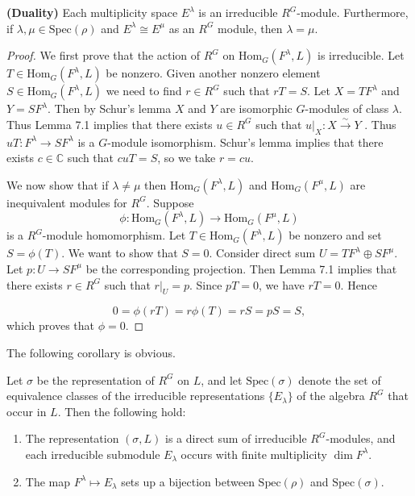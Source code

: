 \documentclass[12pt]{article}
\newenvironment{theorem}[2][Theorem]{\begin{trivlist}
\item[\hskip \labelsep {\bfseries #1}\hskip \labelsep {\bfseries #2.}]}{\end{trivlist}}
\newenvironment{corollary}[2][Corollary]{\begin{trivlist}
\item[\hskip \labelsep {\bfseries #1}\hskip \labelsep {\bfseries #2.}]}{\end{trivlist}}
\begin{document}
    \begin{theorem}{7.2} 
        \textbf{(Duality)} Each multiplicity space $E^\lambda$ is an irreducible $R^G$-module. Furthermore, if $\lambda, \mu \in \mathrm{Spec}(\rho)$ and $E^\lambda \cong E^\mu$ as an $R^G$ module, then $\lambda = \mu$.
    \end{theorem}
    \begin{proof}
        We first prove that the action of $R^G$ on $\mathrm{Hom}_G(F^\lambda, L)$ is irreducible. Let $T \in \mathrm{Hom}_G(F^\lambda, L)$ be nonzero. Given another nonzero element $S \in \mathrm{Hom}_G(F^\lambda, L)$ we need to find $r \in R^G$ such that $rT = S$. Let $X = TF^\lambda$ and $Y = SF^\lambda$. Then by Schur's lemma $X$ and $Y$ are isomorphic $G$-modules of class $\lambda$. Thus Lemma 7.1 implies that there exists $u \in R^G$ such that $u|_X:X\xrightarrow{\sim}Y$ . Thus $uT : F^\lambda \to SF^\lambda$ is a $G$-module isomorphism. Schur's lemma implies that there exists $c \in \mathbb{C}$ such that $cuT = S$, so we take $r = cu$.

        We now show that if $\lambda \neq \mu$ then $\mathrm{Hom}_G(F^\lambda, L)$ and $\mathrm{Hom}_G(F^\mu, L)$ are inequivalent modules for $R^G$. Suppose
        $$
        \phi : \mathrm{Hom}_G(F^\lambda, L) \longrightarrow \mathrm{Hom}_G(F^\mu, L)
        $$
        is a $R^G$-module homomorphism. Let $T \in \mathrm{Hom}_G(F^\lambda, L)$ be nonzero and set $S = \phi(T)$. We want to show that $S = 0$. Consider direct sum $U = TF^\lambda \oplus SF^\mu$. Let $p : U \to SF^\mu$ be the corresponding projection. Then Lemma 7.1 implies that there exists $r \in R^G$ such that $r|_U = p$. Since $pT = 0$, we have $rT = 0$. Hence

        $$
         0 = \phi(rT) = r\phi(T) = rS = pS = S,
        $$
        which proves that $\phi = 0$.
    \end{proof}
    The following corollary is obvious.
    \begin{corollary}{7.3}
        Let $\sigma$ be the representation of $R^G$ on $L$, and let $\mathrm{Spec}(\sigma)$ denote the set of equivalence classes of the irreducible representations $\{E_\lambda\}$ of the algebra $R^G$ that occur in $L$. Then the following hold:
    
        \begin{enumerate}
            \item The representation $(\sigma, L)$ is a direct sum of irreducible $R^G$-modules, and each irreducible submodule $E_\lambda$ occurs with finite multiplicity $\dim F^\lambda$.
            \item The map $F^\lambda \mapsto E_\lambda$ sets up a bijection between $\mathrm{Spec}(\rho)$ and $\mathrm{Spec}(\sigma)$.
        \end{enumerate}
    \end{corollary}
\end{document}
